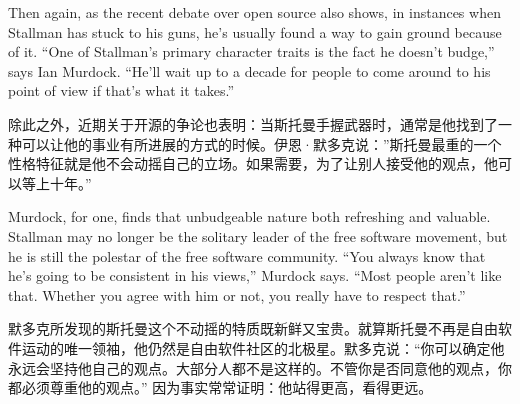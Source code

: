 
\ifdefined\eng
Then again, as the recent debate over open source also shows, in instances when Stallman has stuck to his guns, he's usually found a way to gain ground because of it. ``One of Stallman's primary character traits is the fact he doesn't budge,'' says Ian Murdock. ``He'll wait up to a decade for people to come around to his point of view if that's what it takes.''
\fi

\ifdefined\chs
除此之外，近期关于开源的争论也表明：当斯托曼手握武器时，通常是他找到了一种可以让他的事业有所进展的方式的时候。伊恩·默多克说：''斯托曼最重的一个性格特征就是他不会动摇自己的立场。如果需要，为了让别人接受他的观点，他可以等上十年。''
\fi

\ifdefined\eng
Murdock, for one, finds that unbudgeable nature both refreshing and valuable. Stallman may no longer be the solitary leader of the free software movement, but he is still the polestar of the free software community. ``You always know that he's going to be consistent in his views,'' Murdock says. ``Most people aren't like that. Whether you agree with him or not, you really have to respect that.''
\fi

\ifdefined\chs
默多克所发现的斯托曼这个不动摇的特质既新鲜又宝贵。就算斯托曼不再是自由软件运动的唯一领袖，他仍然是自由软件社区的北极星。默多克说：``你可以确定他永远会坚持他自己的观点。大部分人都不是这样的。不管你是否同意他的观点，你都必须尊重他的观点。'' 因为事实常常证明：他站得更高，看得更远。
\fi

\theendnotes
\setcounter{endnote}{0}
